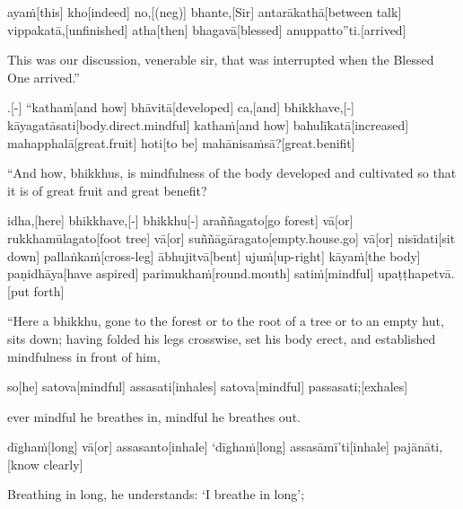 \begin{samepage}
\begingl[glneveryline={\PaliGlossA,\PaliGlossB}]
ayaṁ[this] kho[indeed] no,[(neg)] bhante,[Sir] antarākathā[between talk] vippakatā,[unfinished] atha[then] bhagavā[blessed] anuppatto”ti.[arrived]
\endgl
\nopagebreak
\linespread{0.5}
\begin{spacin}{0.2}
{\PaliGlossFT This was our discussion, venerable sir, that was interrupted when the Blessed One arrived.”}
\end{spacin}
\vskip 12pt
\end{samepage}
\vskip 0.05in
\begin{samepage}
.[-] “kathaṁ[and how] bhāvitā[developed] ca,[and] bhikkhave,[-] kāyagatāsati[body.direct.mindful] kathaṁ[and how] bahulīkatā[increased] mahapphalā[great.fruit] hoti[to be] mahānisaṁsā?[great.benifit]
\endgl
\nopagebreak
\linespread{0.5}
\begin{spacin}{0.2}
{\PaliGlossFT “And how, bhikkhus, is mindfulness of the body developed and cultivated so that it is of great fruit and great benefit?}
\end{spacin}
\vskip 12pt
\end{samepage}
\begin{samepage}
\begingl[glneveryline={\PaliGlossA,\PaliGlossB}]
idha,[here] bhikkhave,[-] bhikkhu[-] araññagato[go forest] vā[or] rukkhamūlagato[foot tree] vā[or] suññāgāragato[empty.house.go] vā[or] nisīdati[sit down] pallaṅkaṁ[cross-leg] ābhujitvā[bent] ujuṁ[up-right] kāyaṁ[the body] paṇidhāya[have aspired] parimukhaṁ[round.mouth] satiṁ[mindful] upaṭṭhapetvā.[put forth]
\endgl
\nopagebreak
\linespread{0.5}
\begin{spacin}{0.2}
{\PaliGlossFT “Here a bhikkhu, gone to the forest or to the root of a tree or to an empty hut, sits down; having folded his legs crosswise, set his body erect, and established mindfulness in front of him,}
\end{spacin}
\vskip 12pt
\end{samepage}
\begin{samepage}
\begingl[glneveryline={\PaliGlossA,\PaliGlossB}]
so[he] satova[mindful] assasati[inhales] satova[mindful] passasati;[exhales]
\endgl
\nopagebreak
\linespread{0.5}
\begin{spacin}{0.2}
{\PaliGlossFT ever mindful he breathes in, mindful he breathes out.}
\end{spacin}
\vskip 12pt
\end{samepage}
\begin{samepage}
\begingl[glneveryline={\PaliGlossA,\PaliGlossB}]
dīghaṁ[long] vā[or] assasanto[inhale] ‘dīghaṁ[long] assasāmī’ti[inhale] pajānāti,[know clearly]
\endgl
\nopagebreak
\linespread{0.5}
\begin{spacin}{0.2}
{\PaliGlossFT Breathing in long, he understands: ‘I breathe in long’;}
\end{spacin}
\vskip 12pt
\end{samepage}
